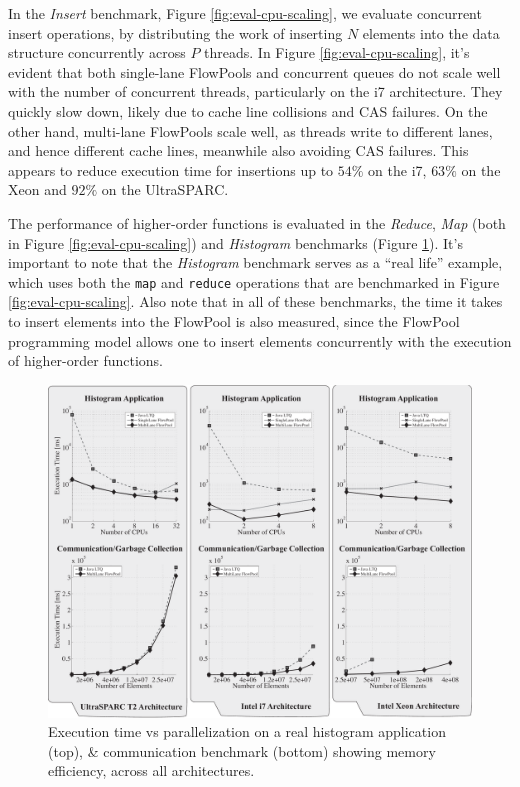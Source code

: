 In the \emph{Insert} benchmark, Figure \ref{fig:eval-cpu-scaling},
we evaluate concurrent insert operations, by distributing the
work of inserting $N$ elements into the data structure concurrently
across $P$ threads.
In Figure \ref{fig:eval-cpu-scaling}, it's evident that both single-lane FlowPools and concurrent queues do
not scale well with the number of concurrent threads, particularly
on the i7 architecture. They quickly slow down, likely due to cache
line collisions and CAS failures.
On the other hand, multi-lane FlowPools scale well, as threads
write to different lanes, and hence different cache lines,
meanwhile also avoiding CAS failures. This appears to reduce execution
time for insertions up to $54\%$ on the i7, $63\%$ on the
Xeon and $92\%$ on the UltraSPARC.

The performance of higher-order functions is evaluated in the \emph{Reduce},
\emph{Map} (both in Figure \ref{fig:eval-cpu-scaling}) and \emph{Histogram}
benchmarks (Figure \ref{fig:eval-hist-comm}).  It's important to note that the
\emph{Histogram} benchmark serves as a ``real life'' example, which uses both
the \verb=map= and \verb=reduce= operations that are benchmarked in Figure
\ref{fig:eval-cpu-scaling}. Also note that in all of these benchmarks, the
time it takes to insert elements into the FlowPool is also measured, since the
FlowPool programming model allows one to insert elements concurrently with the
execution of higher-order functions.


\begin{figure}[t!]
\centering
\includegraphics[width=\textwidth]{images/hist-comm}
\setlength{\abovecaptionskip}{-10pt}
\setlength{\belowcaptionskip}{-15pt}
\caption{Execution time vs parallelization on a real histogram application
(top), \& communication benchmark (bottom) showing memory efficiency,
across all architectures.}
\label{fig:eval-hist-comm}
\end{figure}


